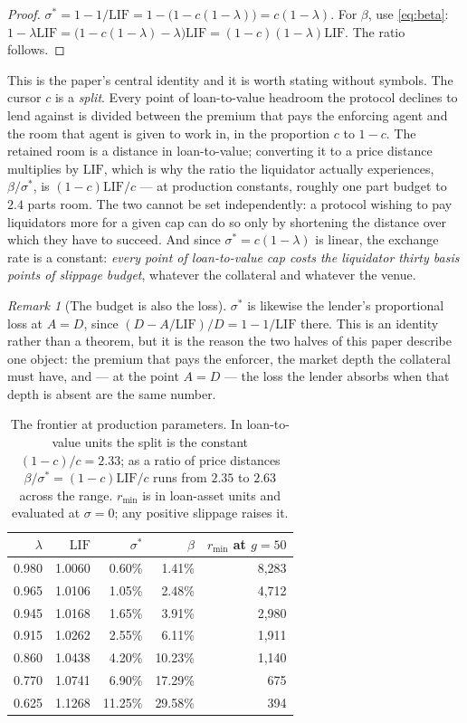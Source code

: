 \documentclass[11pt,a4paper]{article}
\theoremstyle{plain}
\theoremstyle{definition}
\theoremstyle{remark}
\newtheorem{remark}[proposition]{Remark}
\newcommand{\LIF}{\mathrm{LIF}}
\begin{document}
\begin{proof}
$\sigma^{*} = 1-1/\LIF = 1-\bigl(1-c(1-\lambda)\bigr) = c(1-\lambda)$. For $\beta$, use
\eqref{eq:beta}: $1-\lambda\LIF = \bigl(1-c(1-\lambda)-\lambda\bigr)\LIF = (1-c)(1-\lambda)\LIF$.
The ratio follows.
\end{proof}

This is the paper's central identity and it is worth stating without symbols. The cursor $c$ is a
\emph{split}. Every point of loan-to-value headroom the protocol declines to lend against is
divided between the premium that pays the enforcing agent and the room that agent is given to
work in, in the proportion $c$ to $1-c$. The retained room is a distance in loan-to-value;
converting it to a price distance multiplies by $\LIF$, which is why the ratio the liquidator
actually experiences, $\beta/\sigma^{*}$, is $(1-c)\LIF/c$ --- at production constants, roughly one
part budget to $2.4$ parts room. The two cannot be set independently: a protocol wishing to
pay liquidators more for a given cap can do so only by shortening the distance over which they
have to succeed. And since $\sigma^{*}=c(1-\lambda)$ is linear, the exchange rate is a constant:
\emph{every point of loan-to-value cap costs the liquidator thirty basis points of slippage
budget}, whatever the collateral and whatever the venue.

\begin{remark}[The budget is also the loss]
$\sigma^{*}$ is likewise the lender's proportional loss at $A=D$, since
$(D-A/\LIF)/D = 1-1/\LIF$ there. This is an identity rather than a theorem, but it is the reason
the two halves of this paper describe one object: the premium that pays the enforcer, the market
depth the collateral must have, and --- at the point $A=D$ --- the loss the lender absorbs when
that depth is absent are the same number.
\end{remark}

\begin{table}[h]\centering
\begin{tabular}{rrrrr}
\toprule
$\lambda$ & $\LIF$ & $\sigma^{*}$ & $\beta$ & $r_{\min}$ at $g=50$ \\
\midrule
0.980 & 1.0060 & 0.60\% & 1.41\% & 8{,}283 \\
0.965 & 1.0106 & 1.05\% & 2.48\% & 4{,}712 \\
0.945 & 1.0168 & 1.65\% & 3.91\% & 2{,}980 \\
0.915 & 1.0262 & 2.55\% & 6.11\% & 1{,}911 \\
0.860 & 1.0438 & 4.20\% & 10.23\% & 1{,}140 \\
0.770 & 1.0741 & 6.90\% & 17.29\% & 675 \\
0.625 & 1.1268 & 11.25\% & 29.58\% & 394 \\
\bottomrule
\end{tabular}
\caption{The frontier at production parameters. In loan-to-value units the split is the constant
$(1-c)/c = 2.33$; as a ratio of price distances $\beta/\sigma^{*}=(1-c)\LIF/c$ runs from $2.35$ to
$2.63$ across the range. $r_{\min}$ is in loan-asset units and
evaluated at $\sigma=0$; any positive slippage raises it.}
\end{table}
\end{document}
